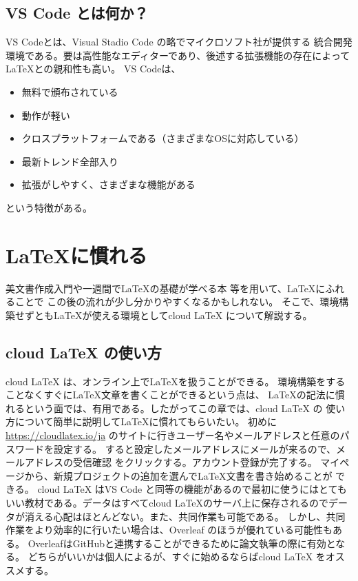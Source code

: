 \documentclass[titlepage]{ltjsarticle}
\begin{document}
\subsection{VS Code とは何か？}
VS Codeとは、Visual Stadio Code の略でマイクロソフト社が提供する
統合開発環境である。要は高性能なエディターであり、後述する拡張機能の存在によって\LaTeX との親和性も高い。
VS Codeは、
\begin{itemize}
  \item 無料で頒布されている
  \item 動作が軽い
  \item クロスプラットフォームである（さまざまなOSに対応している）
  \item 最新トレンド全部入り
  \item 拡張がしやすく、さまざまな機能がある
\end{itemize}
という特徴がある。

\section{\LaTeX に慣れる}
美文書作成入門\cite{美文書本}や一週間で\LaTeX の基礎が学べる本
\cite{一週間基礎}等を用いて、\LaTeX にふれることで
この後の流れが少し分かりやすくなるかもしれない。
そこで、環境構築せずとも\LaTeX が使える環境としてcloud LaTeX 
について解説する。

\subsection{cloud LaTeX の使い方}
cloud LaTeX は、オンライン上で\LaTeX を扱うことができる。
環境構築をすることなくすぐに\LaTeX 文章を書くことができるという点は、
\LaTeX の記法に慣れるという面では、有用である。したがってこの章では、cloud LaTeX の
使い方について簡単に説明して\LaTeX に慣れてもらいたい。
初めに
\url{https://cloudlatex.io/ja}
のサイトに行きユーザー名やメールアドレスと任意のパスワードを設定する。
すると設定したメールアドレスにメールが来るので、メールアドレスの受信確認
をクリックする。アカウント登録が完了する。
マイページから、新規プロジェクトの追加を選んで\LaTeX 文書を書き始めることが
できる。
cloud LaTeX はVS Code と同等の機能があるので最初に使うにはとてもいい教材である。データはすべてcloud LaTeXのサーバ上に保存されるのでデータが消える心配はほとんどない。また、共同作業も可能である。
しかし、共同作業をより効率的に行いたい場合は、Overleaf のほうが優れている可能性もある。
OverleafはGitHubと連携することができるために論文執筆の際に有効となる。
どちらがいいかは個人によるが、すぐに始めるならばcloud LaTeX をオススメする。
\end{document}

